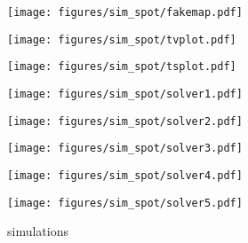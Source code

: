 \documentclass[twocolumn]{aastex631}
\begin{document}
\iftrue
\begin{figure*}[ht!]
    \centering
    \caption{simulations}
    \begin{minipage}[b]{0.2\textwidth}
        \centering
        \texttt{[image: figures/sim\_spot/fakemap.pdf]}
        \label{fig:simspot_fakemap}
    \end{minipage}
    \hfill
    \begin{minipage}[b]{0.2\textwidth}
        \centering
        \texttt{[image: figures/sim\_spot/tvplot.pdf]}
        \label{fig:simspot_tvplot}
    \end{minipage}
    \hfill
    \begin{minipage}[b]{0.2\textwidth}
        \centering
        \texttt{[image: figures/sim\_spot/tsplot.pdf]}
        \label{fig:simspot_tvplot}
    \end{minipage}
    \hfill\hfill\hfill\hfill\hfill\hfill\hfill
    \begin{minipage}[b]{0.2\textwidth}
    \end{minipage}
    
    \vfill
    
    \begin{minipage}[b]{0.18\textwidth}
        \centering
        \texttt{[image: figures/sim\_spot/solver1.pdf]}
        \label{fig:simspot_solver1}
    \end{minipage}
    \hfill
    \begin{minipage}[b]{0.18\textwidth}
        \centering
        \texttt{[image: figures/sim\_spot/solver2.pdf]}
        \label{fig:simspot_solver2}
    \end{minipage}
    \hfill
    \begin{minipage}[b]{0.18\textwidth}
        \centering
        \texttt{[image: figures/sim\_spot/solver3.pdf]}
        \label{fig:simspot_solver3}
    \end{minipage}
    \hfill
    \begin{minipage}[b]{0.18\textwidth}
        \centering
        \texttt{[image: figures/sim\_spot/solver4.pdf]}
        \label{fig:simspot_solver4}
    \end{minipage}
    \hfill
    \begin{minipage}[b]{0.18\textwidth}
        \centering
        \texttt{[image: figures/sim\_spot/solver5.pdf]}
        \label{fig:simspot_solver5}
    \end{minipage}
\end{figure*} 
\fi



\end{document}
